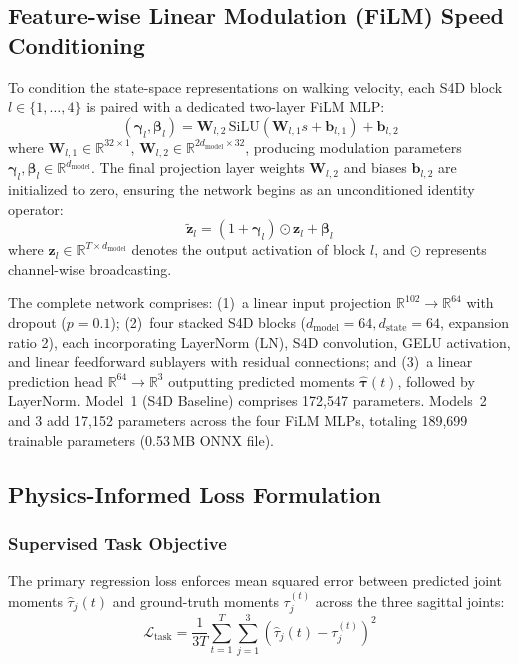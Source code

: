 \documentclass[fleqn,10pt]{wlscirep}
\newcommand{\dmodel}{d_{\mathrm{model}}}
\newcommand{\dstate}{d_{\mathrm{state}}}
\begin{document}
\subsection{Feature-wise Linear Modulation (FiLM) Speed Conditioning}

To condition the state-space representations on walking velocity, each S4D block $l \in \{1, \dots, 4\}$ is paired with a dedicated two-layer FiLM MLP:
\begin{equation}
(\boldsymbol{\gamma}_l, \boldsymbol{\beta}_l) = \mathbf{W}_{l,2} \, \mathrm{SiLU}(\mathbf{W}_{l,1} s + \mathbf{b}_{l,1}) + \mathbf{b}_{l,2}
\label{eq:film_mlp}
\end{equation}
where $\mathbf{W}_{l,1} \in \mathbb{R}^{32 \times 1}$, $\mathbf{W}_{l,2} \in \mathbb{R}^{2\dmodel \times 32}$, producing modulation parameters $\boldsymbol{\gamma}_l, \boldsymbol{\beta}_l \in \mathbb{R}^{\dmodel}$. The final projection layer weights $\mathbf{W}_{l,2}$ and biases $\mathbf{b}_{l,2}$ are initialized to zero, ensuring the network begins as an unconditioned identity operator:
\begin{equation}
\tilde{\mathbf{z}}_l = (1 + \boldsymbol{\gamma}_l) \odot \mathbf{z}_l + \boldsymbol{\beta}_l
\label{eq:film_modulation}
\end{equation}
where $\mathbf{z}_l \in \mathbb{R}^{T \times \dmodel}$ denotes the output activation of block $l$, and $\odot$ represents channel-wise broadcasting.

The complete network comprises: (1)~a linear input projection $\mathbb{R}^{102} \to \mathbb{R}^{64}$ with dropout ($p = 0.1$); (2)~four stacked S4D blocks ($\dmodel = 64, \dstate = 64$, expansion ratio 2), each incorporating LayerNorm (LN), S4D convolution, GELU activation, and linear feedforward sublayers with residual connections; and (3)~a linear prediction head $\mathbb{R}^{64} \to \mathbb{R}^3$ outputting predicted moments $\hat{\boldsymbol{\tau}}(t)$, followed by LayerNorm. Model~1 (S4D Baseline) comprises 172,547 parameters. Models~2 and 3 add 17,152 parameters across the four FiLM MLPs, totaling 189,699 trainable parameters (0.53\,MB ONNX file).

\subsection{Physics-Informed Loss Formulation}

\subsubsection{Supervised Task Objective}
The primary regression loss enforces mean squared error between predicted joint moments $\hat{\tau}_j(t)$ and ground-truth moments $\tau_j^(t)$ across the three sagittal joints:
\begin{equation}
\mathcal{L}_{\mathrm{task}} = \frac{1}{3T} \sum_{t=1}^{T} \sum_{j=1}^{3} \left( \hat{\tau}_j(t) - \tau_j^(t) \right)^2
\label{eq:loss_task}
\end{equation}
\end{document}
